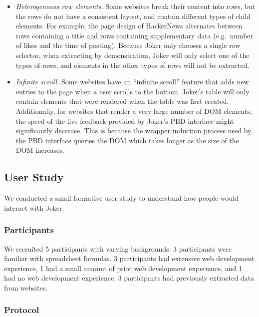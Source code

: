 \documentclass[conference]{IEEEtran}
\providecommand{\tightlist}{%
  \setlength{\itemsep}{0pt}\setlength{\parskip}{0pt}}
\begin{document}
\begin{itemize}
\tightlist
\item
  \emph{Heterogeneous row elements.} Some websites break their content
  into rows, but the rows do not have a consistent layout, and contain
  different types of child elements. For example, the page design of
  HackerNews alternates between rows containing a title and rows
  containing supplementary data (e.g.~number of likes and the time of
  posting). Because Joker only chooses a single row selector, when
  extracting by demonstration, Joker will only select one of the types
  of rows, and elements in the other types of rows will not be
  extracted.
\item
  \emph{Infinite scroll.} Some websites have an ``infinite scroll''
  feature that adds new entries to the page when a user scrolls to the
  bottom. Joker's table will only contain elements that were rendered
  when the table was first created. Additionally, for websites that
  render a very large number of DOM elements, the speed of the live
  feedback provided by Joker's PBD interface might significantly
  decrease. This is because the wrapper induction process used by the
  PBD interface queries the DOM which takes longer as the size of the
  DOM increases.
\end{itemize}

\hypertarget{user-study}{%
\subsection{User Study}\label{user-study}}

We conducted a small formative user study to understand how people would
interact with Joker.

\hypertarget{participants}{%
\subsubsection{Participants}\label{participants}}

We recruited 5 participants with varying backgrounds. 3 participants
were familiar with spreadsheet formulas. 3 participants had extensive
web development experience, 1 had a small amount of prior web
development experience, and 1 had no web development experience. 3
participants had previously extracted data from websites.

\hypertarget{protocol}{%
\subsubsection{Protocol}\label{protocol}}
\end{document}
